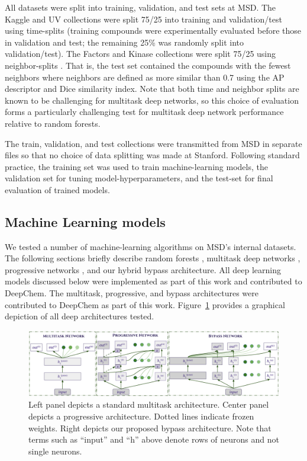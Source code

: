 All datasets were split into training, validation, and test sets at MSD. The Kaggle and UV collections were split 75/25 into training and validation/test using time-splits (training compounds were experimentally evaluated before those in validation and test; the remaining 25\% was randomly split into validation/test). The Factors and Kinase collections were split 75/25 using neighbor-splits \cite{sheridan2013time}. That is, the test set contained the compounds with the fewest neighbors where neighbors are defined as more similar than 0.7 using the AP descriptor and Dice similarity index. Note that both time and neighbor splits are known to be challenging for multitask deep networks, so this choice of evaluation forms a particularly challenging test for multitask deep network performance relative to random forests.

The train, validation, and test collections were transmitted from MSD in separate files so that no choice of data splitting was made at Stanford. Following standard practice, the training set was used to train machine-learning models, the validation set for tuning model-hyperparameters, and the test-set for final evaluation of trained models. 


\subsection{Machine Learning models}

We tested a number of machine-learning algorithms on MSD's internal datasets. The following sections briefly describe random forests \cite{breiman2001random}, multitask deep networks \cite{ma2015deep}, progressive networks \cite{rusu2016progressive}, and our hybrid bypass architecture. All deep learning models discussed below were implemented as part of this work and contributed to DeepChem. The multitask, progressive, and bypass architectures were contributed to DeepChem as part of this work. Figure~\ref{fig:arch} provides a graphical depiction of all deep architectures tested.

\begin{figure}
  \includegraphics[width=\textwidth]{Images/robust_architectures.png}
  \caption{Left panel depicts a standard multitask architecture. Center panel depicts a progressive architecture. Dotted lines indicate frozen weights. Right depicts our proposed bypass architecture. Note that terms such as ``input'' and ``h'' above denote rows of neurons and not single neurons.}
  \label{fig:arch}
\end{figure}
